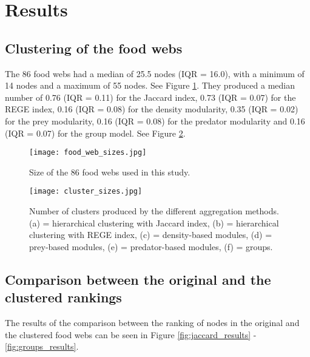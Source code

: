 \section*{Results}

	\subsection*{Clustering of the food webs}

		The 86 food webs had a median of 25.5 nodes (IQR = 16.0), with a minimum of 14 nodes and a maximum of 55 nodes. See Figure \ref{fig:food_web_sizes}. They produced a median number of 0.76 (IQR = 0.11) for the Jaccard index, 0.73 (IQR = 0.07) for the REGE index, 0.16 (IQR = 0.08) for the density modularity, 0.35 (IQR = 0.02) for the prey modularity, 0.16 (IQR = 0.08) for the predator modularity and 0.16 (IQR = 0.07) for the group model. See Figure \ref{fig:cluster_sizes}.

						\begin{figure}[htbp]%
								\centering
								\texttt{[image: food\_web\_sizes.jpg]}
								\caption{Size of the 86 food webs used in this study.}
								\label{fig:food_web_sizes}
						\end{figure}

						\begin{figure}[htbp]%
								\centering
								\texttt{[image: cluster\_sizes.jpg]}
								\caption{Number of clusters produced by the different aggregation methods. (a) = hierarchical clustering with Jaccard index, (b) = hierarchical clustering with REGE index, (c) = density-based modules, (d) = prey-based modules, (e) = predator-based modules, (f) = groups.}
								\label{fig:cluster_sizes}
							\end{figure}


	\subsection*{Comparison between the original and the clustered rankings}

	The results of the comparison between the ranking of nodes in the original and the clustered food webs can be seen in Figure \ref{fig:jaccard_results} - \ref{fig:groups_results}.
